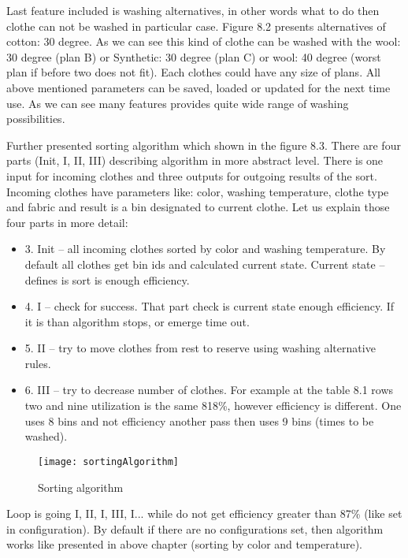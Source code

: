 \newpage
Last feature included is washing alternatives, in other words what to do then clothe can not be washed in particular case. Figure 8.2 presents alternatives of cotton: 30 degree. As we can see this kind of clothe can be washed with the wool: 30 degree (plan B) or Synthetic: 30 degree (plan C) or wool: 40 degree (worst plan if before two does not fit). Each clothes could have any size of plans. All above mentioned parameters can be saved, loaded or updated for the next time use. As we can see many features provides quite wide range of washing possibilities.

Further presented sorting algorithm which shown in the figure 8.3. There are four parts (Init, I, II, III) describing algorithm in more abstract level. There is one input for incoming clothes and three outputs for outgoing results of the sort. Incoming clothes have parameters like: color, washing temperature, clothe type and fabric and result is a bin designated to current clothe.  Let us explain those four parts in more detail:

\begin{itemize}
	\item 3. Init – all incoming clothes sorted by color and washing temperature. By default all clothes get bin ids and calculated current state. Current state – defines is sort is enough efficiency.
	\item 4. I – check for success. That part check is current state enough efficiency. If it is than algorithm stops, or emerge time out.
	\item 5. II – try to move clothes from rest to reserve using washing alternative rules. 
	\item 6. III – try to decrease number of clothes. For example at the table 8.1 rows two and nine utilization is the same 818\%, however efficiency is different. One uses 8 bins and not efficiency another pass then uses 9 bins (times to be washed).
\end{itemize}

\begin{figure}[h]
	\centering
		\texttt{[image: sortingAlgorithm]}
	\caption{Sorting algorithm}
	\label{fig:planning}
\end{figure}

Loop is going I, II, I, III, I... while do not get efficiency greater than 87\% (like set in configuration). By default if there are no configurations set, then algorithm works like presented in above chapter (sorting by color and temperature).

